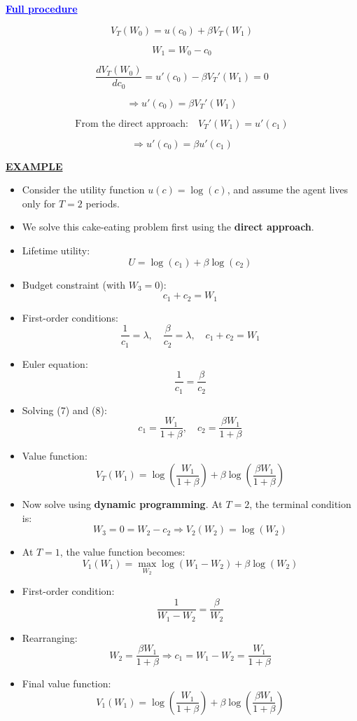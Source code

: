 \documentclass[12pt]{article}
\begin{document}
\textcolor{blue}{\textbf{\uline{Full procedure}}}

{\color{blue}
\[
V_T(W_0) = u(c_0) + \beta V_T(W_1)
\]

\[
W_1 = W_0 - c_0
\]

\[
\frac{dV_T(W_0)}{dc_0} = u'(c_0) - \beta V_T'(W_1) = 0
\]

\[
\Rightarrow u'(c_0) = \beta V_T'(W_1)
\]

\[
\text{From the direct approach:} \quad V_T'(W_1) = u'(c_1)
\]

\[
\Rightarrow u'(c_0) = \beta u'(c_1)
\]
}

\textbf{\uline{EXAMPLE}}

\begin{itemize}
    \item Consider the utility function \( u(c) = \log(c) \), and assume the agent lives only for \( T = 2 \) periods.

    \item We solve this cake-eating problem first using the \textbf{direct approach}.

    \item Lifetime utility:
    \[
    U = \log(c_1) + \beta \log(c_2)
    \]

    \item Budget constraint (with \( W_3 = 0 \)):
    \[
    c_1 + c_2 = W_1
    \]

    \item First-order conditions:
    \[
    \frac{1}{c_1} = \lambda, \quad \frac{\beta}{c_2} = \lambda, \quad c_1 + c_2 = W_1 \tag{7}
    \]

    \item Euler equation:
    \[
    \frac{1}{c_1} = \frac{\beta}{c_2} \tag{8}
    \]

    \item Solving (7) and (8):
    \[
    c_1 = \frac{W_1}{1 + \beta}, \quad c_2 = \frac{\beta W_1}{1 + \beta}
    \]

    \item Value function:
    \[
    V_T(W_1) = \log\left( \frac{W_1}{1 + \beta} \right) + \beta \log\left( \frac{\beta W_1}{1 + \beta} \right)
    \]

    \item Now solve using \textbf{dynamic programming}. At \( T = 2 \), the terminal condition is:
    \[
    W_3 = 0 = W_2 - c_2 \Rightarrow V_2(W_2) = \log(W_2)
    \]

    \item At \( T = 1 \), the value function becomes:
    \[
    V_1(W_1) = \max_{W_2} \log(W_1 - W_2) + \beta \log(W_2)
    \]

    \item First-order condition:
    \[
    \frac{1}{W_1 - W_2} = \frac{\beta}{W_2}
    \]

    \item Rearranging:
    \[
    W_2 = \frac{\beta W_1}{1 + \beta}
    \Rightarrow c_1 = W_1 - W_2 = \frac{W_1}{1 + \beta}
    \]

    \item Final value function:
    \[
    V_1(W_1) = \log\left( \frac{W_1}{1 + \beta} \right) + \beta \log\left( \frac{\beta W_1}{1 + \beta} \right)
    \]
\end{itemize}
\end{document}
